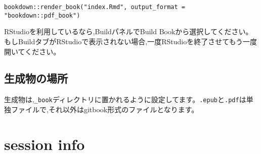 \documentclass[
]{book}
\begin{document}
\begin{verbatim}
bookdown::render_book("index.Rmd", output_format = "bookdown::pdf_book")
\end{verbatim}

RStudioを利用しているなら,BuildパネルでBuild Bookから選択してください。もしBuildタブがRStudioで表示されない場合,一度RStudioを終了させてもう一度開いてください。

\hypertarget{ux751fux6210ux7269ux306eux5834ux6240}{%
\subsection{生成物の場所}\label{ux751fux6210ux7269ux306eux5834ux6240}}

生成物は,\texttt{\_book}ディレクトリに置かれるように設定してます。\texttt{.epub}と\texttt{.pdf}は単独ファイルで,それ以外はgitbook形式のファイルとなります。

\hypertarget{session-info}{%
\section{session info}\label{session-info}}
\end{document}
